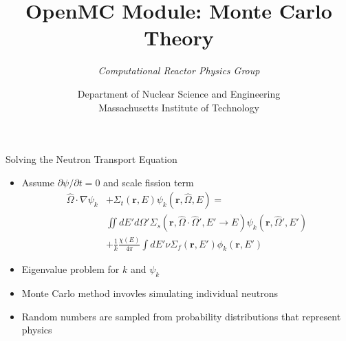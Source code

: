 \documentclass[serif]{beamer}
\title{OpenMC Module: Monte Carlo Theory}
\author{\emph{Computational Reactor Physics Group}}
\date{\normalsize Department of Nuclear Science and Engineering\\
                  Massachusetts Institute of Technology}
\begin{document}

\frame{\titlepage}\logo{} %


\begin{frame}{Solving the Neutron Transport Equation}

  \begin{itemize}
    \item<1-> Assume $\partial\psi / \partial t = 0$ and scale fission term
      \begin{equation*}
        \begin{split}
          \hat{\Omega} \cdot \nabla \psi_k &+ \Sigma_t(\mathbf{r},E)
          \psi_k(\mathbf{r},\hat\Omega,E) = \\ &\iint dE' d\Omega'
          \Sigma_s(\mathbf{r},\hat\Omega\cdot\hat\Omega',E'\to
          E)\psi_k(\mathbf{r},\hat\Omega',E') \\ &+ \frac{1}{k} \frac{\chi(E)}{4\pi}
          \int dE' \nu \Sigma_f(\mathbf{r},E')\phi_k(\mathbf{r},E')
        \end{split}
      \end{equation*}\vfill
    \item<1-> Eigenvalue problem for $k$ and $\psi_k$\vfill
    \item<1-> Monte Carlo method invovles simulating individual neutrons\vfill
    \item<1-> Random numbers are sampled from probability distributions that
              represent physics 
  \end{itemize}

\end{frame}

\end{document}
